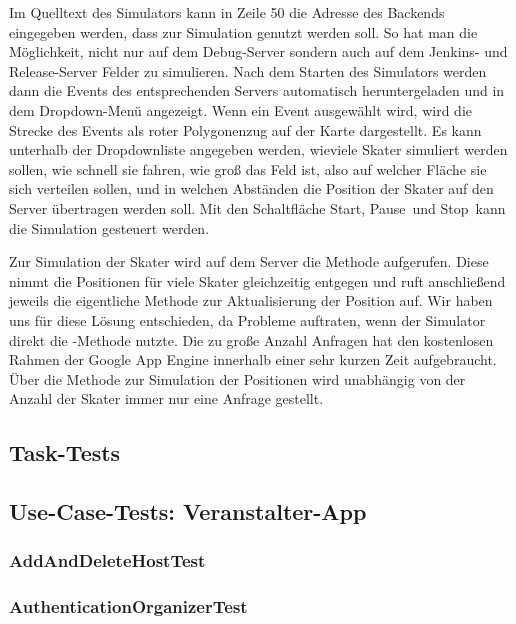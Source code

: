 Im Quelltext des Simulators kann in Zeile 50 die Adresse des Backends eingegeben werden, dass zur Simulation genutzt werden soll. So hat man die Möglichkeit, nicht nur auf dem Debug-Server sondern auch auf dem Jenkins- und Release-Server Felder zu simulieren. Nach dem Starten des Simulators werden dann die Events des entsprechenden Servers automatisch heruntergeladen und in dem Dropdown-Menü angezeigt. Wenn ein Event ausgewählt wird, wird die Strecke des Events als roter Polygonenzug auf der Karte dargestellt. Es kann unterhalb der Dropdownliste angegeben werden, wieviele Skater simuliert werden sollen, wie schnell sie fahren, wie groß das Feld ist, also auf welcher Fläche sie sich verteilen sollen, und in welchen Abständen die Position der Skater auf den Server übertragen werden soll. Mit den Schaltfläche \glqq Start\grqq, \glqq Pause\grqq\ und \glqq Stop\grqq\ kann die Simulation gesteuert werden.

Zur Simulation der Skater wird auf dem Server die Methode  aufgerufen. Diese nimmt die Positionen für viele Skater gleichzeitig entgegen und ruft anschließend jeweils die eigentliche Methode zur Aktualisierung der Position  auf. Wir haben uns für diese Lösung entschieden, da Probleme auftraten, wenn der Simulator direkt die -Methode nutzte. Die zu große Anzahl Anfragen hat den kostenlosen Rahmen der Google App Engine innerhalb einer sehr kurzen Zeit aufgebraucht. Über die Methode zur Simulation der Positionen wird unabhängig von der Anzahl der Skater immer nur eine Anfrage gestellt.

\subsection{Task-Tests}

\subsection{Use-Case-Tests: Veranstalter-App}
\subsubsection{AddAndDeleteHostTest}

\subsubsection{AuthenticationOrganizerTest}


